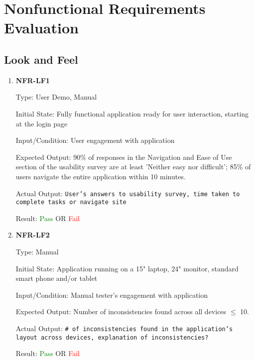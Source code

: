 \documentclass[12pt, titlepage]{article}
\begin{document}
\section{Nonfunctional Requirements Evaluation}

\subsection{Look and Feel}
\begin{enumerate}
\item{\textbf{NFR-LF1}} \label{NFR:LF1}

Type: User Demo, Manual

Initial State: Fully functional application ready for user interaction, starting
at the login page

Input/Condition: User engagement with application

Expected Output: 90\% of responses in the Navigation and Ease of Use section of
the usability survey are at least 'Neither easy nor difficult'; 85\% of users
navigate the entire application within 10 minutes.

Actual Output: \texttt{User's answers to usability survey, time taken to
complete tasks or navigate site}

Result: \textcolor{green}{Pass} OR \textcolor{red}{Fail}

\item{\textbf{NFR-LF2}} \label{NFR:LF2}

Type: Manual

Initial State: Application running on a 15" laptop, 24" monitor, standard smart
phone and/or tablet

Input/Condition: Manual tester's engagement with application

Expected Output: Number of inconsistencies found across all devices $\leq$ 10.

Actual Output: \texttt{\# of inconsistencies found in the application's layout
across devices, explanation of inconsistencies?}

Result: \textcolor{green}{Pass} OR \textcolor{red}{Fail}
\end{enumerate}
\end{document}
